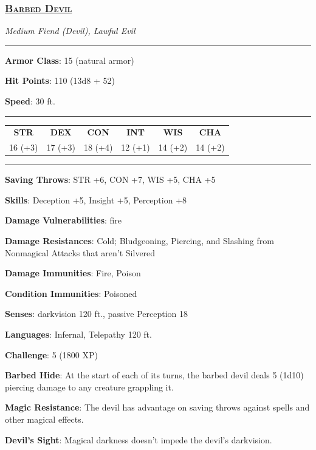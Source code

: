\subsubsection*{\underline{\textsc{\Large Barbed Devil}}}
\noindent\emph{Medium Fiend (Devil), Lawful Evil} 

\noindent\rule{0.5\textwidth}{0.5pt}

\noindent\textbf{Armor Class}: 15 (natural armor)

\noindent\textbf{Hit Points}: 110 (13d8 + 52)

\noindent\textbf{Speed}: 30 ft.

\noindent\rule{0.5\textwidth}{0.5pt}
\begin{table}[H]
	\begin{tabular}{cccccc}
		\textbf{STR} & \textbf{DEX} & \textbf{CON} & \textbf{INT} & \textbf{WIS} & \textbf{CHA} \\
		16 (+3) & 17 (+3) & 18 (+4) & 12 (+1) & 14 (+2) & 14 (+2) \\
	\end{tabular}
\end{table}
\noindent\rule{0.5\textwidth}{0.5pt}

\noindent\textbf{Saving Throws}: STR +6, CON +7, WIS +5, CHA +5

\noindent\textbf{Skills}: Deception +5, Insight +5, Perception +8

\noindent\textbf{Damage Vulnerabilities}: fire

\noindent\textbf{Damage Resistances}: Cold; Bludgeoning, Piercing, and Slashing from Nonmagical Attacks that aren't Silvered

\noindent\textbf{Damage Immunities}: Fire, Poison

\noindent\textbf{Condition Immunities}: Poisoned

\noindent\textbf{Senses}: darkvision 120 ft., passive Perception 18

\noindent\textbf{Languages}: Infernal, Telepathy 120 ft.

\noindent\textbf{Challenge}: 5 (1800 XP)

\noindent\textbf{Barbed Hide}: At the start of each of its turns, the barbed devil deals 5 (1d10) piercing damage to any creature grappling it.

\noindent\textbf{Magic Resistance}: The devil has advantage on saving throws against spells and other magical effects.

\noindent\textbf{Devil's Sight}: Magical darkness doesn't impede the devil's darkvision.

